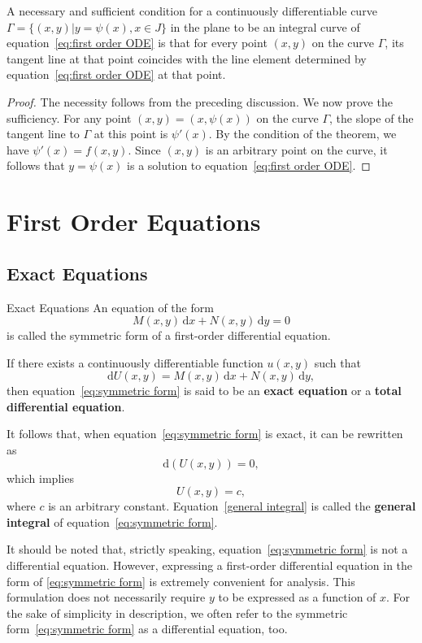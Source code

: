 \documentclass[11pt]{../../TexTemplate/elegantbook}
\begin{document}
\begin{theorem}
    A necessary and sufficient condition for a continuously differentiable curve 
    $\Gamma = \{ (x,y) | y = \psi(x), x \in J \}$ in the plane 
    to be an integral curve of equation~\eqref{eq:first order ODE} is that 
    for every point $(x, y)$ on the curve $\Gamma$, 
    its tangent line at that point coincides with the line element determined 
    by equation~\eqref{eq:first order ODE} at that point.
\end{theorem}

\begin{proof}
    The necessity follows from the preceding discussion. 
    We now prove the sufficiency. 
    For any point $(x, y) = (x, \psi(x))$ on the curve $\Gamma$, 
    the slope of the tangent line to $\Gamma$ at this point is $\psi'(x)$. 
    By the condition of the theorem, we have $\psi'(x) = f(x, y)$. 
    Since $(x, y)$ is an arbitrary point on the curve, it follows that $y = \psi(x)$ is a solution to equation~\eqref{eq:first order ODE}. 
\end{proof}

\chapter{First Order Equations}
\section{Exact Equations}
\begin{definition}{Exact Equations}
An equation of the form
\begin{equation}\label{eq:symmetric form}
    M(x,y) \, \mathrm{d}x + N(x,y) \, \mathrm{d}y = 0
\end{equation}
is called the symmetric form of a first-order differential equation.

If there exists a continuously differentiable function $u(x,y)$ such that
\[
\mathrm{d}U(x,y) = M(x,y) \, \mathrm{d}x + N(x,y) \, \mathrm{d}y,
\]
then equation~\eqref{eq:symmetric form} is said to be an \textbf{exact equation} or a \textbf{total differential equation}.

It follows that, when equation~\eqref{eq:symmetric form} is exact, it can be rewritten as
\[
\mathrm{d}(U(x,y)) = 0,
\]
which implies
\begin{equation}\label{general integral}
    U(x,y) = c,
\end{equation}
where $c$ is an arbitrary constant. Equation~\eqref{general integral} is called the \textbf{general integral} of equation~\eqref{eq:symmetric form}.
\end{definition}
\begin{remark}
    It should be noted that, strictly speaking, 
    equation~\eqref{eq:symmetric form} is not a differential equation. 
    However, expressing a first-order differential equation in the form of \eqref{eq:symmetric form} is extremely convenient for analysis.
    This formulation does not necessarily require $y$ to be expressed as a function of $x$. 
    For the sake of simplicity in description, we often refer to the symmetric form~\eqref{eq:symmetric form} as a differential equation, too.
\end{remark}
\end{document}
